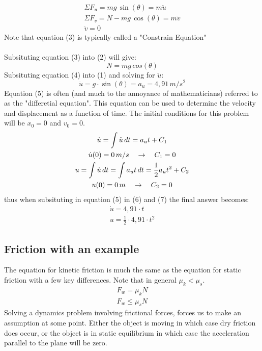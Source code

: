 \documentclass[11pt, a4paper]{article}
\begin{document}
\begin{gather}
    \Sigma F_u = mg \,\sin(\theta) = m\ddot{u} \\
    \Sigma F_v = N - mg \, \cos(\theta) = m\ddot{v} \\
    \ddot{v} = 0
\end{gather}
Note that equation (3) is typically called a "Constrain Equation"\\
\\
Subsituting equation (3) into (2) will give:
\begin{equation}
    N = m g \,cos(\theta)
\end{equation}
Subsituting equation (4) into (1) and solving for $\ddot{u}$:
\begin{equation}
    \ddot{u} = g \cdot \sin(\theta) = a_u = 4,91 \,m/s^2
\end{equation}
Equation (5) is often (and much to the annoyance of mathematicians) referred to as the "differetial equation".
This equation can be used to determine the velocity and displacement as a function of time. The initial
conditions for this problem will be $x_0 = 0$ and $v_0 = 0$.
\begin{gather}
    \dot{u} = \int \ddot{u} \,dt = a_u t + C_1\\
    \dot{u}(0) = 0\,m/s \quad \rightarrow \quad C_1 = 0 \notag \\
    u = \int \dot{u} \,dt = \int a_u t \,dt = \frac{1}{2} a_u t^2 + C_2\\
    u(0) = 0\,m \quad \rightarrow \quad C_2 = 0 \notag
\end{gather}
thus when subsituting in equation (5) in (6) and (7) the final answer becomes:
\begin{gather*}
    \dot{u} = 4,91 \cdot t \\
    u = \frac{1}{2} \cdot 4,91 \cdot t^2
\end{gather*}


\subsection{Friction with an example}
\setcounter{equation}{0}
The equation for kinetic friction is much the same as the equation
for static friction with a few key differences. Note that in general $\mu_k < \mu_s$.
\begin{gather*}
    F_w = \mu_k N \\
    F_w \leq \mu_s N
\end{gather*}
Solving a dynamics problem involving frictional forces, forces us to make an assumption
at some point. Either the object is moving in which case dry friction does occur,
or the object is in static equilibrium in which case the acceleration parallel to the plane will be zero.
\end{document}
